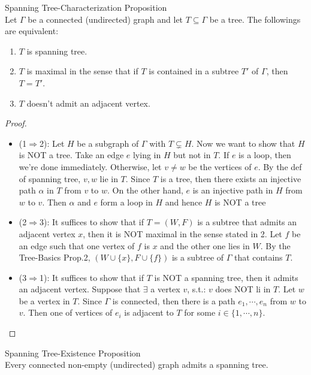 \begin{proposition}{Spanning Tree-Characterization Proposition}\\
Let $\Gamma$ be a connected (undirected) graph and let $T \subseteq \Gamma$ be a tree. The followings are equivalent:
\begin{enumerate}
    \item $T$ is spanning tree.
    \item $T$ is maximal in the sense that if $T$ is contained in a subtree $T'$ of $\Gamma$, then $T=T'$.
    \item $T$ doesn't admit an adjacent vertex.
\end{enumerate}
\end{proposition}

\begin{proof}
    \begin{itemize}
        \item (1$\Rightarrow$2): Let $H$ be a subgraph of $\Gamma$ with $T \subsetneq H$. Now we want to show that $H$ is NOT a tree. Take an edge $e$ lying in $H$ but not in $T$. If $e$ is a loop, then we're done immediately. Otherwise, let $v \neq w$ be the vertices of $e$. By the def of spanning tree, $v,w$ lie in $T$. Since $T$ is a tree, then there exists an injective path $\alpha$ in $T$ from $v$ to $w$. On the other hand, $e$ is an injective path in $H$ from $w$ to $v$. Then $\alpha$ and $e$ form a loop in $H$ and hence $H$ is NOT a tree

        \item (2$\Rightarrow$3): It suffices to show that if $T=(W,F)$ is a subtree that admits an adjacent vertex $x$, then it is NOT maximal in the sense stated in 2. Let $f$ be an edge such that one vertex of $f$ is $x$ and the other one lies in $W$. By the Tree-Basics Prop.2, $(W \cup \{x\}, F \cup\{f\})$ is a subtree of $\Gamma$ that contains $T$.

        \item (3$\Rightarrow$1): It suffices to show that if $T$ is NOT a spanning tree, then it admits an adjacent vertex. Suppose that $\exists$ a vertex $v$, s.t.: $v$ does NOT li in $T$. Let $w$ be a vertex in $T$. Since $\Gamma$ is connected, then there is a path $e_1,\cdots, e_n$ from $w$ to $v$. Then one of vertices of $e_i$ is adjacent to $T$ for some $i \in \{1,\cdots,n\}$.
    \end{itemize}
\end{proof}

\begin{proposition}{Spanning Tree-Existence Proposition}\\
Every connected non-empty (undirected) graph admits a spanning tree.
\end{proposition}

